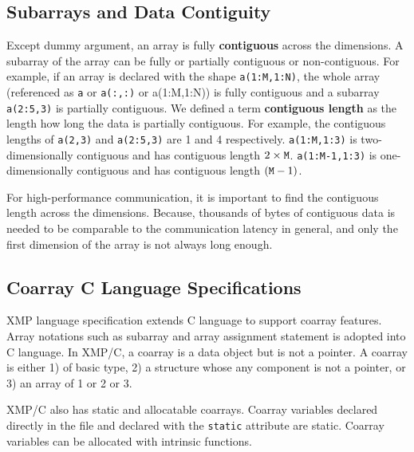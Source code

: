 \subsection{Subarrays and Data Contiguity}\label{sec:spec-contig}

Except dummy argument, an array is fully {\bf contiguous} across the dimensions.
A subarray of the array can be fully or partially contiguous or non-contiguous.
For example, if an array is declared with the shape {\tt a(1:M,1:N)},
the whole array (referenced as {\tt a} or {\tt a(:,:)} or {a(1:M,1:N)})
is fully contiguous and a subarray {\tt a(2:5,3)} is partially contiguous.
We defined a term {\bf contiguous length} as the length how long the data is partially
contiguous. For example, the contiguous lengths of {\tt a(2,3)} and {\tt a(2:5,3)} are
1 and 4 respectively.  {\tt a(1:M,1:3)} is two-dimensionally contiguous and has 
contiguous length $2 \times {\tt M}$.
{\tt a(1:M-1,1:3)} is one-dimensionally contiguous and has 
contiguous length $({\tt M} - 1)$.

\requirement
For high-performance communication, it is important to find the contiguous length
across the dimensions. Because, thousands of bytes of contiguous data is needed to be 
comparable to the communication latency in general, and only the first dimension 
of the array is not always long enough.
%


\subsection{Coarray C Language Specifications}\label{sec:spec-c}

XMP language specification extends C language to support coarray 
features. Array notations such as subarray and array assignment statement
is adopted into C language.
%
In XMP/C, a coarray is a data object but is not a pointer.
A coarray is either 1) of basic type, 2) a structure whose
any component is not a pointer, or 3) an array of 1 or 2 or 3.

XMP/C also has static and allocatable coarrays.
Coarray variables declared directly in the file and declared with 
the {\tt static} attribute are static.
Coarray variables can be allocated with intrinsic functions.




